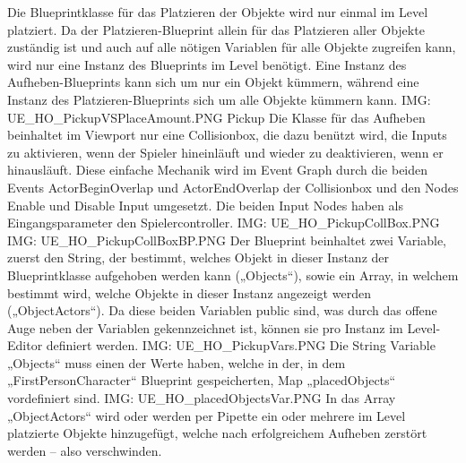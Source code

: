 Die Blueprintklasse für das Platzieren der Objekte wird nur einmal im Level platziert. Da der Platzieren-Blueprint allein für das Platzieren aller Objekte zuständig ist und auch auf alle nötigen Variablen für alle Objekte zugreifen kann, wird nur eine Instanz des Blueprints im Level benötigt.
Eine Instanz des Aufheben-Blueprints kann sich um nur ein Objekt kümmern, während eine Instanz des Platzieren-Blueprints sich um alle Objekte kümmern kann.
{IMG: UE_HO_PickupVSPlaceAmount.PNG}
Pickup
Die Klasse für das Aufheben beinhaltet im Viewport nur eine Collisionbox, die dazu benützt wird, die Inputs zu aktivieren, wenn der Spieler hineinläuft und wieder zu deaktivieren, wenn er hinausläuft. Diese einfache Mechanik wird im Event Graph durch die beiden Events ActorBeginOverlap und ActorEndOverlap der Collisionbox und den Nodes Enable und Disable Input umgesetzt. Die beiden Input Nodes haben als Eingangsparameter den Spielercontroller.
{IMG: UE_HO_PickupCollBox.PNG}
{IMG: UE_HO_PickupCollBoxBP.PNG}
Der Blueprint beinhaltet zwei Variable, zuerst den String, der bestimmt, welches Objekt in dieser Instanz der Blueprintklasse aufgehoben werden kann („Objects“), sowie ein Array, in welchem bestimmt wird, welche Objekte in dieser Instanz angezeigt werden („ObjectActors“). Da diese beiden Variablen public sind, was durch das offene Auge neben der Variablen gekennzeichnet ist, können sie pro Instanz im Level-Editor definiert werden. {IMG: UE_HO_PickupVars.PNG}
Die String Variable „Objects“ muss einen der Werte haben, welche in der, in dem „FirstPersonCharacter“ Blueprint gespeicherten, Map „placedObjects“ vordefiniert sind.
{IMG: UE_HO_placedObjectsVar.PNG}
In das Array „ObjectActors“ wird oder werden per Pipette ein oder mehrere im Level platzierte Objekte hinzugefügt, welche nach erfolgreichem Aufheben zerstört werden – also verschwinden.

